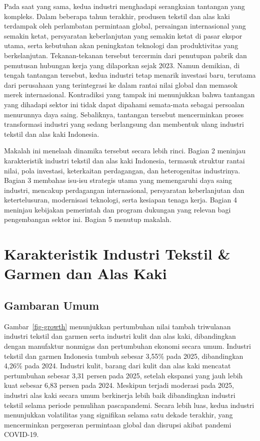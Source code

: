 \documentclass[
  manuscript=article,
  layout=publish,
  year=2026,
  volume=1,
]{den}
\begin{document}
Pada saat yang sama, kedua industri menghadapi serangkaian tantangan
yang kompleks. Dalam beberapa tahun terakhir, produsen tekstil dan alas
kaki terdampak oleh perlambatan permintaan global, persaingan
internasional yang semakin ketat, persyaratan keberlanjutan yang semakin
ketat di pasar ekspor utama, serta kebutuhan akan peningkatan teknologi
dan produktivitas yang berkelanjutan. Tekanan-tekanan tersebut tercermin
dari penutupan pabrik dan pemutusan hubungan kerja yang dilaporkan sejak
2023. Namun demikian, di tengah tantangan tersebut, kedua industri tetap
menarik investasi baru, terutama dari perusahaan yang terintegrasi ke
dalam rantai nilai global dan memasok merek internasional. Kontradiksi
yang tampak ini menunjukkan bahwa tantangan yang dihadapi sektor ini
tidak dapat dipahami semata-mata sebagai persoalan menurunnya daya
saing. Sebaliknya, tantangan tersebut mencerminkan proses transformasi
industri yang sedang berlangsung dan membentuk ulang industri tekstil
dan alas kaki Indonesia.

Makalah ini menelaah dinamika tersebut secara lebih rinci. Bagian 2
meninjau karakteristik industri tekstil dan alas kaki Indonesia,
termasuk struktur rantai nilai, pola investasi, keterkaitan perdagangan,
dan heterogenitas industrinya. Bagian 3 membahas isu-isu strategis utama
yang memengaruhi daya saing industri, mencakup perdagangan
internasional, persyaratan keberlanjutan dan ketertelusuran, modernisasi
teknologi, serta kesiapan tenaga kerja. Bagian 4 meninjau kebijakan
pemerintah dan program dukungan yang relevan bagi pengembangan sektor
ini. Bagian 5 menutup makalah.

\section{Karakteristik Industri Tekstil \& Garmen dan Alas
Kaki}\label{karakteristik-industri-tekstil-garmen-dan-alas-kaki}

\subsection{Gambaran Umum}\label{gambaran-umum}

Gambar~\ref{fig-growth} menunjukkan pertumbuhan nilai tambah triwulanan
industri tekstil dan garmen serta industri kulit dan alas kaki,
dibandingkan dengan manufaktur nonmigas dan pertumbuhan ekonomi secara
umum. Industri tekstil dan garmen Indonesia tumbuh sebesar 3,55\% pada
2025, dibandingkan 4,26\% pada 2024. Industri kulit, barang dari kulit
dan alas kaki mencatat pertumbuhan sebesar 3,31 persen pada 2025,
setelah ekspansi yang jauh lebih kuat sebesar 6,83 persen pada 2024.
Meskipun terjadi moderasi pada 2025, industri alas kaki secara umum
berkinerja lebih baik dibandingkan industri tekstil selama periode
pemulihan pascapandemi. Secara lebih luas, kedua industri menunjukkan
volatilitas yang signifikan selama satu dekade terakhir, yang
mencerminkan pergeseran permintaan global dan disrupsi akibat pandemi
COVID-19.
\end{document}
